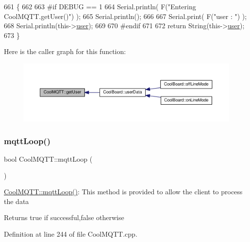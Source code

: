 \begin{DoxyCode}
661 \{
662 
663 \textcolor{preprocessor}{#if DEBUG == 1 }
664     Serial.println( F(\textcolor{stringliteral}{"Entering CoolMQTT.getUser()"}) );
665     Serial.println();
666     
667     Serial.print( F(\textcolor{stringliteral}{"user : "}) );
668     Serial.println(this->\hyperlink{classCoolMQTT_a8cd47e45d457f908d4b4390b35aaee83}{user});
669 
670 \textcolor{preprocessor}{#endif}
671 
672     \textcolor{keywordflow}{return} String(this->\hyperlink{classCoolMQTT_a8cd47e45d457f908d4b4390b35aaee83}{user});
673 \}
\end{DoxyCode}
Here is the caller graph for this function\+:\nopagebreak
\begin{figure}[H]
\begin{center}
\leavevmode
\includegraphics[width=350pt]{classCoolMQTT_a373cc92fca7760d886f02d8a6e5b3f63_icgraph}
\end{center}
\end{figure}
\mbox{\label{classCoolMQTT_aa5eaae967b562b62cbcf2b8d81f6e5d5}} 
\subsubsection{\texorpdfstring{mqtt\+Loop()}{mqttLoop()}}
{\footnotesize\ttfamily bool Cool\+M\+Q\+T\+T\+::mqtt\+Loop (\begin{DoxyParamCaption}{ }\end{DoxyParamCaption})}

\hyperlink{classCoolMQTT_aa5eaae967b562b62cbcf2b8d81f6e5d5}{Cool\+M\+Q\+T\+T\+::mqtt\+Loop()}\+: This method is provided to allow the client to process the data

\begin{DoxyReturn}{Returns}
true if successful,false otherwise 
\end{DoxyReturn}


Definition at line 244 of file Cool\+M\+Q\+T\+T.\+cpp.



